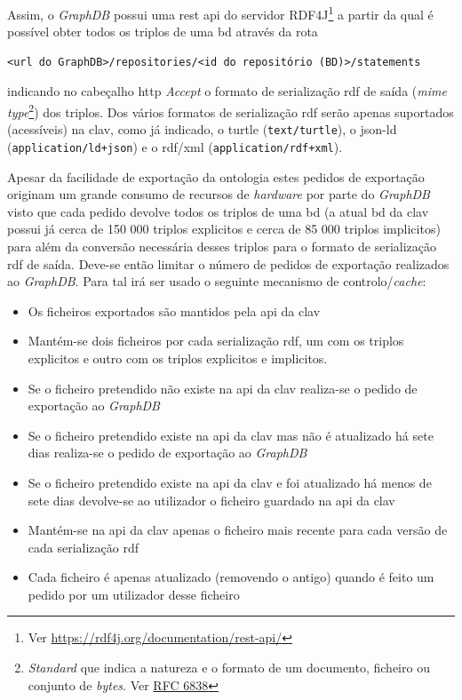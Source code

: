 Assim, o \textit{GraphDB} possui uma \acrshort{rest} \acrshort{api} do servidor RDF4J\footnote{Ver \url{https://rdf4j.org/documentation/rest-api/}} a partir da qual é possível obter todos os triplos de uma \acrshort{bd} através da rota 
\begin{verbatim}
<url do GraphDB>/repositories/<id do repositório (BD)>/statements
\end{verbatim}
indicando no cabeçalho \acrshort{http} \textit{Accept} o formato de serialização \acrshort{rdf} de saída (\textit{\acrshort{mime} type}\footnote{\textit{Standard} que indica a natureza e o formato de um documento, ficheiro ou conjunto de \textit{bytes}. Ver \href{https://tools.ietf.org/html/rfc6838}{RFC 6838}}) dos triplos. Dos vários formatos de serialização \acrshort{rdf} serão apenas suportados (acessíveis) na \acrshort{clav}, como já indicado, o \acrshort{turtle} (\texttt{text/turtle}), o \acrshort{json-ld} (\texttt{application/ld+json}) e o \acrshort{rdf}/\acrshort{xml} (\texttt{application/rdf+xml}).

Apesar da facilidade de exportação da ontologia estes pedidos de exportação originam um grande consumo de recursos de \textit{hardware} por parte do \textit{GraphDB} visto que cada pedido devolve todos os triplos de uma \acrshort{bd} (a atual \acrshort{bd} da \acrshort{clav} possui já cerca de 150 000 triplos explicitos e cerca de 85 000 triplos implicitos) para além da conversão necessária desses triplos para o formato de serialização \acrshort{rdf} de saída. Deve-se então limitar o número de pedidos de exportação realizados ao \textit{GraphDB}. Para tal irá ser usado o seguinte mecanismo de controlo/\textit{cache}:

\begin{itemize}
    \item Os ficheiros exportados são mantidos pela \acrshort{api} da \acrshort{clav}
    \item Mantém-se dois ficheiros por cada serialização \acrshort{rdf}, um com os triplos explicitos e outro com os triplos explicitos e implicitos.
    \item Se o ficheiro pretendido não existe na \acrshort{api} da \acrshort{clav} realiza-se o pedido de exportação ao \textit{GraphDB}
    \item Se o ficheiro pretendido existe na \acrshort{api} da \acrshort{clav} mas não é atualizado há sete dias realiza-se o pedido de exportação ao \textit{GraphDB}
    \item Se o ficheiro pretendido existe na \acrshort{api} da \acrshort{clav} e foi atualizado há menos de sete dias devolve-se ao utilizador o ficheiro guardado na \acrshort{api} da \acrshort{clav}
    \item Mantém-se na \acrshort{api} da \acrshort{clav} apenas o ficheiro mais recente para cada versão de cada serialização \acrshort{rdf}
    \item Cada ficheiro é apenas atualizado (removendo o antigo) quando é feito um pedido por um utilizador desse ficheiro
\end{itemize}

